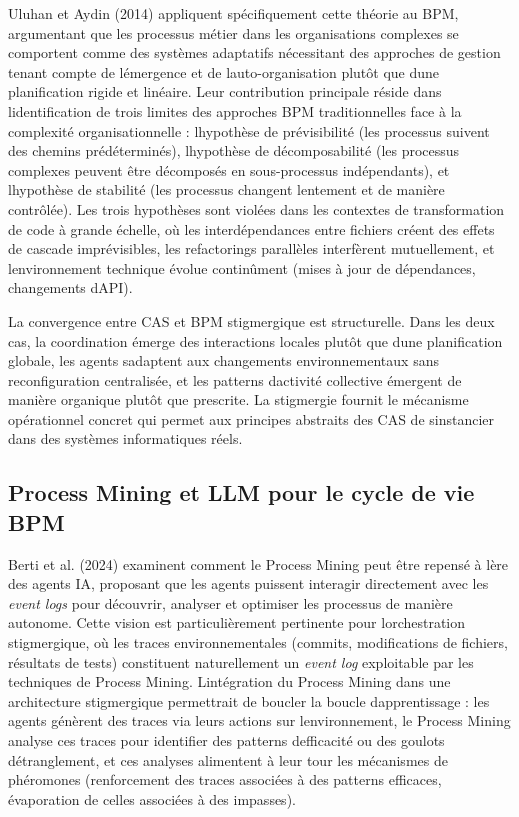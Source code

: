 \documentclass[12pt,a4paper]{article}
\begin{document}
Uluhan et Aydin (2014) appliquent spécifiquement cette théorie au BPM,
argumentant que les processus métier dans les organisations complexes se
comportent comme des systèmes adaptatifs nécessitant des approches de
gestion tenant compte de l\textquotesingle émergence et de
l\textquotesingle auto-organisation plutôt que d\textquotesingle une
planification rigide et linéaire. Leur contribution principale réside
dans l\textquotesingle identification de trois limites des approches BPM
traditionnelles face à la complexité organisationnelle :
l\textquotesingle hypothèse de prévisibilité (les processus suivent des
chemins prédéterminés), l\textquotesingle hypothèse de décomposabilité
(les processus complexes peuvent être décomposés en sous-processus
indépendants), et l\textquotesingle hypothèse de stabilité (les
processus changent lentement et de manière contrôlée). Les trois
hypothèses sont violées dans les contextes de transformation de code à
grande échelle, où les interdépendances entre fichiers créent des effets
de cascade imprévisibles, les refactorings parallèles interfèrent
mutuellement, et l\textquotesingle environnement technique évolue
continûment (mises à jour de dépendances, changements
d\textquotesingle API).

La convergence entre CAS et BPM stigmergique est structurelle. Dans les
deux cas, la coordination émerge des interactions locales plutôt que
d\textquotesingle une planification globale, les agents
s\textquotesingle adaptent aux changements environnementaux sans
reconfiguration centralisée, et les patterns d\textquotesingle activité
collective émergent de manière organique plutôt que prescrite. La
stigmergie fournit le mécanisme opérationnel concret qui permet aux
principes abstraits des CAS de s\textquotesingle instancier dans des
systèmes informatiques réels.

\subsection{Process Mining et LLM pour le cycle de vie
BPM}\label{process-mining-et-llm-pour-le-cycle-de-vie-bpm}

Berti et al. (2024) examinent comment le Process Mining peut être
repensé à l\textquotesingle ère des agents IA, proposant que les agents
puissent interagir directement avec les \emph{event logs} pour
découvrir, analyser et optimiser les processus de manière autonome.
Cette vision est particulièrement pertinente pour
l\textquotesingle orchestration stigmergique, où les traces
environnementales (commits, modifications de fichiers, résultats de
tests) constituent naturellement un \emph{event log} exploitable par les
techniques de Process Mining. L\textquotesingle intégration du Process
Mining dans une architecture stigmergique permettrait de boucler la
boucle d\textquotesingle apprentissage : les agents génèrent des traces
via leurs actions sur l\textquotesingle environnement, le Process Mining
analyse ces traces pour identifier des patterns
d\textquotesingle efficacité ou des goulots
d\textquotesingle étranglement, et ces analyses alimentent à leur tour
les mécanismes de phéromones (renforcement des traces associées à des
patterns efficaces, évaporation de celles associées à des impasses).
\end{document}
